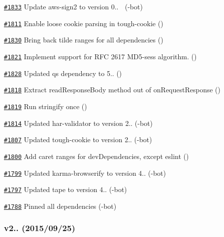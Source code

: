 \begin{DoxyItemize}
\item \href{https://github.com/request/request/pull/1833}{\tt \#1833} Update aws-\/sign2 to version 0.. 🚀 (-\/bot)
\item \href{https://github.com/request/request/pull/1811}{\tt \#1811} Enable loose cookie parsing in tough-\/cookie ()
\item \href{https://github.com/request/request/pull/1830}{\tt \#1830} Bring back tilde ranges for all dependencies ()
\item \href{https://github.com/request/request/pull/1821}{\tt \#1821} Implement support for R\+FC 2617 M\+D5-\/sess algorithm. ()
\item \href{https://github.com/request/request/pull/1828}{\tt \#1828} Updated qs dependency to 5.. ()
\item \href{https://github.com/request/request/pull/1818}{\tt \#1818} Extract {\ttfamily read\+Response\+Body} method out of {\ttfamily on\+Request\+Response} ()
\item \href{https://github.com/request/request/pull/1819}{\tt \#1819} Run stringify once ()
\item \href{https://github.com/request/request/pull/1814}{\tt \#1814} Updated har-\/validator to version 2.. (-\/bot)
\item \href{https://github.com/request/request/pull/1807}{\tt \#1807} Updated tough-\/cookie to version 2.. (-\/bot)
\item \href{https://github.com/request/request/pull/1800}{\tt \#1800} Add caret ranges for dev\+Dependencies, except eslint ()
\item \href{https://github.com/request/request/pull/1799}{\tt \#1799} Updated karma-\/browserify to version 4.. (-\/bot)
\item \href{https://github.com/request/request/pull/1797}{\tt \#1797} Updated tape to version 4.. (-\/bot)
\item \href{https://github.com/request/request/pull/1788}{\tt \#1788} Pinned all dependencies (-\/bot)
\end{DoxyItemize}

\subsubsection*{v2.. (2015/09/25)}


